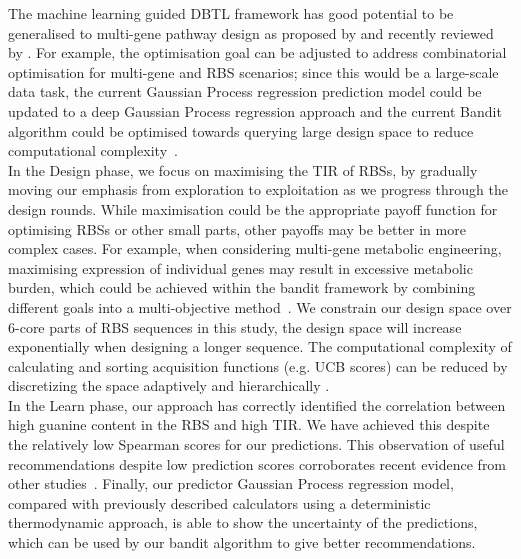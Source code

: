 \documentclass{scrartcl}[2013/05/29]%
\begin{document}
The machine learning guided DBTL framework has good potential to be generalised to multi-gene pathway
design as proposed by \textcite{hamedirad2019towards} and recently reviewed by \textcite{LAWSON2021}.
For example, the optimisation goal can be adjusted to address combinatorial optimisation for multi-gene and RBS scenarios; since this would be a large-scale data task, the current Gaussian Process regression prediction model could be updated to a deep Gaussian Process regression approach and the current Bandit algorithm could be optimised towards querying large design space to reduce computational complexity~\cite{Shahriari2016}.\\

In the Design phase, we focus on maximising the TIR of RBSs, by gradually moving our emphasis from exploration to exploitation as we progress through the design rounds.
While maximisation could be the appropriate payoff function for optimising RBSs
or other small parts, other payoffs may be better in more complex cases.
For example, when considering multi-gene metabolic engineering, maximising expression of individual genes may result in excessive metabolic burden, 
which could be achieved within the bandit framework by 
combining different goals into a multi-objective method~\cite{shu2020new}.
We constrain our design space over 6-core parts of RBS sequences in this study, the design space will increase exponentially when designing a longer sequence. 
The computational complexity of calculating and sorting acquisition functions (e.g. UCB scores) can be reduced by discretizing the space adaptively and hierarchically \cite{shekhar2018GPBanditDiscre, zhang2021GPOO}.\\

In the Learn phase, our approach has correctly identified the correlation between high guanine content in the RBS and high TIR.
We have achieved this despite the relatively low Spearman scores for our predictions. This observation of useful recommendations despite low prediction scores corroborates recent evidence from other studies~\cite{Radivojevic2020, Opgenorth2019}.
Finally, our predictor Gaussian Process regression model, compared with previously described calculators using a deterministic thermodynamic approach, is able to show the uncertainty of the predictions, which can be used by our bandit algorithm to give better recommendations.\\
\end{document}
